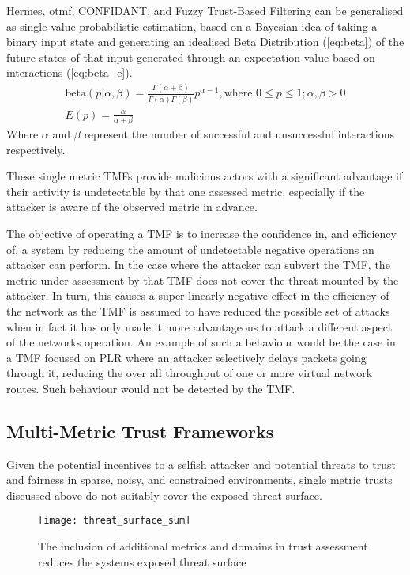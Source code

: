 Hermes, \gls{otmf}, CONFIDANT, and Fuzzy Trust-Based Filtering can be generalised as single-value probabilistic estimation, based on a Bayesian idea of taking a binary input state and generating an idealised Beta Distribution (\ref{eq:beta}) of the future states of that input generated through an expectation value based on interactions (\ref{eq:beta_e}).
%
\begin{align}
  \label{eq:beta}
  \text{beta}(p|\alpha,\beta) = \frac{\Gamma(\alpha + \beta)}{\Gamma(\alpha)\Gamma(\beta)}p^{\alpha-1},\text{where } 0 \leq p \leq 1; \alpha,\beta > 0\\
  \label{eq:beta_e}
  E(p) = \frac{\alpha}{\alpha + \beta}
\end{align}
%
Where $\alpha$ and $\beta$ represent the number of successful and unsuccessful interactions respectively.

These single metric TMFs provide malicious actors with a significant advantage if their activity is undetectable by that one assessed metric, especially if the attacker is aware of the observed metric in advance.

The objective of operating a TMF is to increase the confidence in, and efficiency of, a system by reducing the amount of undetectable negative operations an attacker can perform.
In the case where the attacker can subvert the TMF, the metric under assessment by that TMF does not cover the threat mounted by the attacker.
In turn, this causes a super-linearly negative effect in the efficiency of the network as the TMF is assumed to have reduced the possible set of attacks when in fact it has only made it more advantageous to attack a different aspect of the networks operation.
An example of such a behaviour would be the case in a TMF focused on PLR where an attacker selectively delays packets going through it, reducing the over all throughput of one or more virtual network routes.
Such behaviour would not be detected by the TMF.

\subsection{Multi-Metric Trust Frameworks}\label{sec:multimetrictrust}
Given the potential incentives to a selfish attacker and potential threats to trust and fairness in sparse, noisy, and constrained environments, single metric trusts discussed above do not suitably cover the exposed threat surface.

\begin{figure}[h!]
	\centering
	\texttt{[image: threat\_surface\_sum]}
	\caption{The inclusion of additional metrics and domains in trust assessment reduces the systems exposed threat surface}
	\label{fig:threat_surface}
\end{figure}

